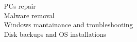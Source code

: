 \documentclass{article}
\begin{document}
\begin{paracol}{2}
\begin{tcolorbox}[title=\faTools \ Computer Technician Internship,colback=white,arc=0pt]
    \tcblower

    \faLaptop \ PCs repair \\[4pt]
    \faShieldVirus \ Malware removal \\[4pt]
    \faRecycle \ Windows mantainance and troubleshooting \\[4pt]
    \faHdd \ Disk backups and OS installations
\end{tcolorbox}

\end{paracol}
\end{document}
